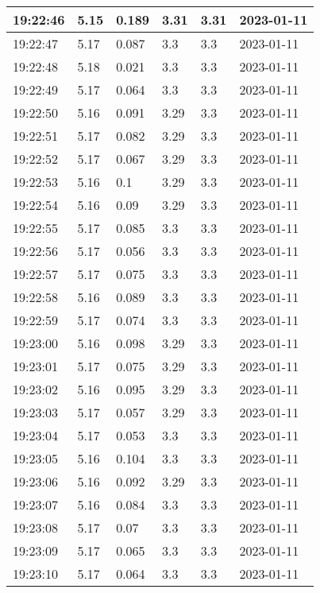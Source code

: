 \begin{longtable}{|l|l|l|l|l|l|}
        19:22:46 & 5.15 & 0.189 & 3.31 & 3.31 & 2023-01-11 \\ \hline
        19:22:47 & 5.17 & 0.087 & 3.3 & 3.3 & 2023-01-11 \\ \hline
        19:22:48 & 5.18 & 0.021 & 3.3 & 3.3 & 2023-01-11 \\ \hline
        19:22:49 & 5.17 & 0.064 & 3.3 & 3.3 & 2023-01-11 \\ \hline
        19:22:50 & 5.16 & 0.091 & 3.29 & 3.3 & 2023-01-11 \\ \hline
        19:22:51 & 5.17 & 0.082 & 3.29 & 3.3 & 2023-01-11 \\ \hline
        19:22:52 & 5.17 & 0.067 & 3.29 & 3.3 & 2023-01-11 \\ \hline
        19:22:53 & 5.16 & 0.1 & 3.29 & 3.3 & 2023-01-11 \\ \hline
        19:22:54 & 5.16 & 0.09 & 3.29 & 3.3 & 2023-01-11 \\ \hline
        19:22:55 & 5.17 & 0.085 & 3.3 & 3.3 & 2023-01-11 \\ \hline
        19:22:56 & 5.17 & 0.056 & 3.3 & 3.3 & 2023-01-11 \\ \hline
        19:22:57 & 5.17 & 0.075 & 3.3 & 3.3 & 2023-01-11 \\ \hline
        19:22:58 & 5.16 & 0.089 & 3.3 & 3.3 & 2023-01-11 \\ \hline
        19:22:59 & 5.17 & 0.074 & 3.3 & 3.3 & 2023-01-11 \\ \hline
        19:23:00 & 5.16 & 0.098 & 3.29 & 3.3 & 2023-01-11 \\ \hline
        19:23:01 & 5.17 & 0.075 & 3.29 & 3.3 & 2023-01-11 \\ \hline
        19:23:02 & 5.16 & 0.095 & 3.29 & 3.3 & 2023-01-11 \\ \hline
        19:23:03 & 5.17 & 0.057 & 3.29 & 3.3 & 2023-01-11 \\ \hline
        19:23:04 & 5.17 & 0.053 & 3.3 & 3.3 & 2023-01-11 \\ \hline
        19:23:05 & 5.16 & 0.104 & 3.3 & 3.3 & 2023-01-11 \\ \hline
        19:23:06 & 5.16 & 0.092 & 3.29 & 3.3 & 2023-01-11 \\ \hline
        19:23:07 & 5.16 & 0.084 & 3.3 & 3.3 & 2023-01-11 \\ \hline
        19:23:08 & 5.17 & 0.07 & 3.3 & 3.3 & 2023-01-11 \\ \hline
        19:23:09 & 5.17 & 0.065 & 3.3 & 3.3 & 2023-01-11 \\ \hline
        19:23:10 & 5.17 & 0.064 & 3.3 & 3.3 & 2023-01-11 \\ \hline

\end{longtable}

